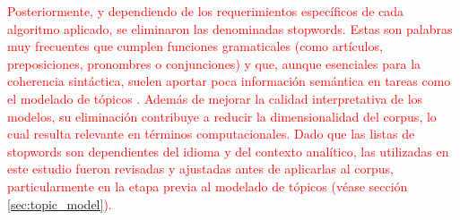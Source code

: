\documentclass[11pt,a4paper]{article}
\begin{document}
		\textcolor{red}{
		Posteriormente, y dependiendo de los requerimientos específicos de cada algoritmo aplicado, se eliminaron las denominadas stopwords. Estas son palabras muy frecuentes que cumplen funciones gramaticales (como artículos, preposiciones, pronombres o conjunciones) y que, aunque esenciales para la coherencia sintáctica, suelen aportar poca información semántica en tareas como el modelado de tópicos \cite{Siino2024}. Además de mejorar la calidad interpretativa de los modelos, su eliminación contribuye a reducir la dimensionalidad del corpus, lo cual resulta relevante en términos computacionales. Dado que las listas de stopwords son dependientes del idioma y del contexto analítico, las utilizadas en este estudio fueron revisadas y ajustadas antes de aplicarlas al corpus, particularmente en la etapa previa al modelado de tópicos (véase sección \ref{sec:topic_model}).}
		
\end{document}
